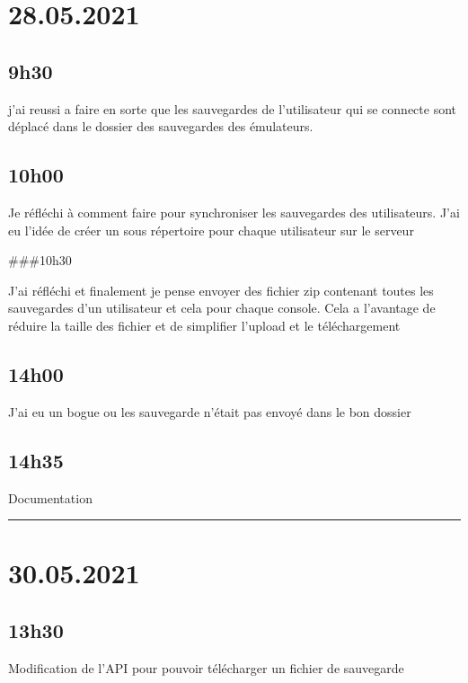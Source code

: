 \documentclass[a4paper,12pt,french]{sphinxmanual}
\begin{document}
\section{28.05.2021}
\label{\detokenize{logbook:id168}}

\subsection{9h30}
\label{\detokenize{logbook:id169}}
\sphinxAtStartPar
j’ai reussi a faire en sorte que les sauvegardes de l’utilisateur qui se connecte sont déplacé dans le dossier des sauvegardes des émulateurs.


\subsection{10h00}
\label{\detokenize{logbook:id170}}
\sphinxAtStartPar
Je réfléchi à comment faire pour synchroniser les sauvegardes des utilisateurs. J’ai eu l’idée de créer un sous répertoire pour chaque utilisateur sur le serveur

\sphinxAtStartPar
\#\#\#10h30

\sphinxAtStartPar
J’ai réfléchi et finalement je pense envoyer des fichier zip contenant toutes les sauvegardes d’un utilisateur et cela pour chaque console. Cela a l’avantage de réduire la taille des fichier et de simplifier l’upload et le téléchargement


\subsection{14h00}
\label{\detokenize{logbook:id171}}
\sphinxAtStartPar
J’ai eu un bogue ou les sauvegarde n’était pas envoyé dans le bon dossier


\subsection{14h35}
\label{\detokenize{logbook:id172}}
\sphinxAtStartPar
Documentation


\bigskip\hrule\bigskip



\section{30.05.2021}
\label{\detokenize{logbook:id173}}

\subsection{13h30}
\label{\detokenize{logbook:id174}}
\sphinxAtStartPar
Modification de l’API pour pouvoir télécharger un fichier de sauvegarde
\end{document}
